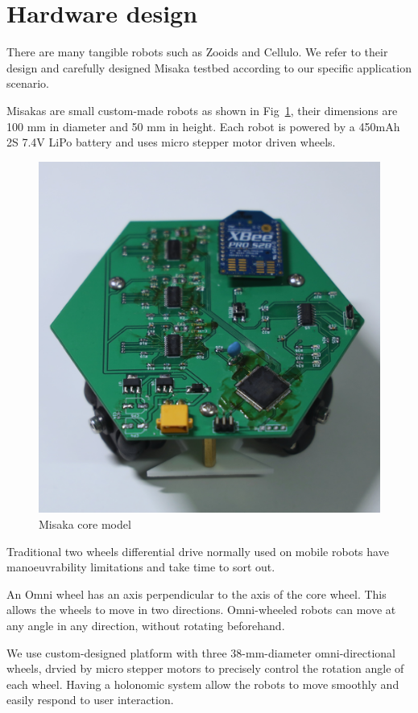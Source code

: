 \documentclass[conference]{IEEEtran}
\begin{document}





\section{Hardware design}

There are many tangible robots such as Zooids\cite{le2016zooids} and Cellulo\cite{ozgur2017cellulo}. We refer to their design and carefully designed Misaka testbed according to our specific application scenario.


Misakas are small custom-made robots as shown in Fig~\ref{fig:model}, their dimensions are 100 mm in diameter and 50 mm in height. Each robot is powered by a 450mAh 2S 7.4V LiPo battery and uses micro stepper motor driven wheels.

\begin{figure}[htbp]
    \centering
    \includegraphics[width=0.6\columnwidth]{model.jpg}
    \caption{Misaka core model}
    \label{fig:model}
\end{figure}

Traditional two wheels differential drive normally used on mobile robots have manoeuvrability limitations and take time to sort out\cite{ribeiro2004three}. 

An Omni wheel has an axis perpendicular to the axis of the core wheel. This allows the wheels to move in two directions. Omni-wheeled robots can move at any angle in any direction, without rotating beforehand.

We use custom-designed platform with three 38-mm-diameter omni-directional wheels, drvied by micro stepper motors to precisely control the rotation angle of each wheel. Having a holonomic system allow the robots to move smoothly and easily respond to user interaction.
\end{document}

